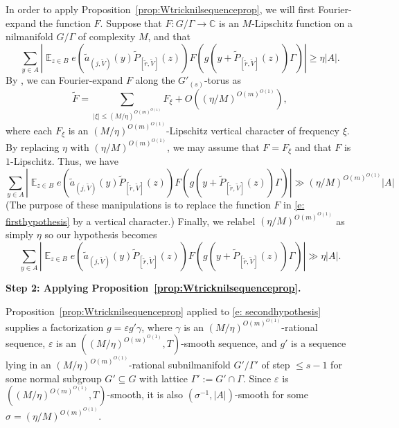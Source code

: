 \documentclass[11pt]{amsart}
\theoremstyle{definition}
\DeclareMathOperator*{\E}{\mathbb{E}}
\newcommand{\veps}{\varepsilon}
\newcommand{\abs}[1]{\mathopen{}\left| #1\mathclose{}\right|}
\begin{document}
In order to apply Proposition~\ref{prop:Wtricknilsequenceprop}, we will first Fourier-expand the function $F$. Suppose that $F:G/\Gamma \to \mathbb{C}$ is an $M$-Lipschitz function on a nilmanifold $G/\Gamma$ of complexity $M$, and that
\begin{equation}\label{e: firsthypothesis}
\sum_{y \in A} \abs{\E_{z \in B}e(\tilde{a}_{(j, \tilde{V})}(y)\widetilde{P}_{[\tilde{r}, \tilde{V}]}(z))F(g(y + \widetilde{P}_{[\tilde{r}, \tilde{V}]}(z))\Gamma)} \ge \eta |A|.   
\end{equation}
By \cite[Lemma A.6]{Leng23b}, we can Fourier-expand $F$ along the $G'_{(s)}$-torus as
$$\tilde{F} = \sum_{|\xi| \le (M/\eta)^{O(m)^{O(1)}}} F_\xi + O((\eta/M)^{O(m)^{O(1)}}),$$
where each $F_\xi$ is an $(M/\eta)^{O(m)^{O(1)}}$-Lipschitz vertical character of frequency $\xi$. By replacing $\eta$ with $(\eta/M)^{O(m)^{O(1)}}$, we may assume that $F = F_\xi$ and that $F$ is $1$-Lipschitz.
Thus, we have
\begin{equation}
\sum_{y \in A} \abs{\E_{z \in B}e(\tilde{a}_{(j, \tilde{V})}(y)\widetilde{P}_{[\tilde{r}, \tilde{V}]}(z))F(g(y + \widetilde{P}_{[\tilde{r}, \tilde{V}]}(z))\Gamma)}\gg (\eta/M)^{O(m)^{O(1)}} |A|
\end{equation}
(The purpose of these manipulations is to replace the function $F$ in \eqref{e: firsthypothesis} by a vertical character.) Finally, we relabel $(\eta/M)^{O(m)^{O(1)}}$ as simply $\eta$ so our hypothesis becomes
\begin{equation}\label{e: secondhypothesis}
\sum_{y \in A} \abs{\E_{z \in B}e(\tilde{a}_{(j, \tilde{V})}(y)\widetilde{P}_{[\tilde{r}, \tilde{V}]}(z))F(g(y + \widetilde{P}_{[\tilde{r}, \tilde{V}]}(z))\Gamma)}\gg \eta |A|.
\end{equation}

\smallskip
\textbf{Step 2: Applying Proposition~\ref{prop:Wtricknilsequenceprop}.}
\smallskip

Proposition~\ref{prop:Wtricknilsequenceprop} applied to \eqref{e: secondhypothesis} supplies a factorization $g = \varepsilon g' \gamma$, where $\gamma$ is an $(M/\eta)^{O(m)^{O(1)}}$-rational sequence, $\veps$ is an $((M/\eta)^{O(m)^{O(1)}}, T)$-smooth sequence, and $g'$ is a sequence lying in an $(M/\eta)^{O(m)^{O(1)}}$-rational subnilmanifold $G'/\Gamma'$ of step $\le s - 1$ for some normal subgroup $G'\subseteq G$ with lattice $\Gamma' := G'\cap \Gamma$. Since $\varepsilon$ is $((M/\eta)^{O(m)^{O(1)}}, T)$-smooth, it is also $(\sigma^{-1}, |A|)$-smooth for some $\sigma = (\eta/M)^{O(m)^{O(1)}}$.
\end{document}
